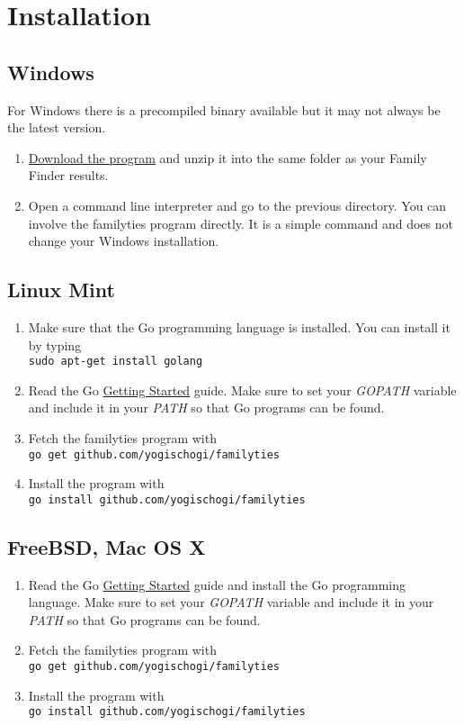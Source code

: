\documentclass[12pt,a4paper]{article}
\begin{document}
\section{Installation}

\subsection{Windows}
For Windows there is a precompiled binary available but it
may not always be the latest version.
\begin{enumerate}
\item \href{http://www.projectory.de/temp/familyties.zip}
  {Download the program} and unzip it into the same folder
  as your Family Finder results.
\item Open a command line interpreter and go to the previous
  directory. You can involve the familyties program directly.
  It is a simple command and does not change your Windows
  installation.
\end{enumerate}

\subsection{Linux Mint}
\begin{enumerate}
\item Make sure that the Go programming language is installed.
	You can install it by typing\\
	\texttt{sudo apt-get install golang}
\item Read the Go
	\href{http://golang.org/doc/install}{Getting Started}
	guide. Make sure to set your \emph{GOPATH} variable and
	include it in your \emph{PATH} so that Go programs can be
	found.
\item Fetch the familyties program with\\
	\texttt{go get github.com/yogischogi/familyties}
\item Install the program with\\
	 \texttt{go install github.com/yogischogi/familyties}
\end{enumerate}

\subsection{FreeBSD, Mac OS X}
\begin{enumerate}
\item Read the Go
	\href{http://golang.org/doc/install}{Getting Started}
	guide and install the Go programming language. 
    Make sure to set your \emph{GOPATH} variable and
	include it in your \emph{PATH} so that Go programs can be
	found.
\item Fetch the familyties program with\\
	\texttt{go get github.com/yogischogi/familyties}
\item Install the program with\\
	 \texttt{go install github.com/yogischogi/familyties}
\end{enumerate}
\end{document}
